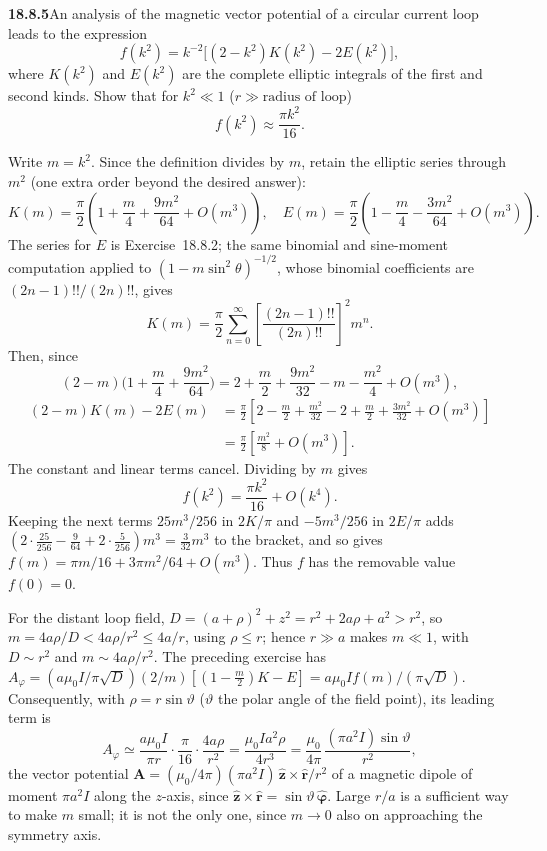 \par\bigskip
\noindent\textbf{18.8.5}\quad An analysis of the magnetic vector
potential of a circular current loop leads to the expression
\[
f(k^{2})=k^{-2}\big[(2-k^{2})K(k^{2})-2E(k^{2})\big],
\]
where $K(k^{2})$ and $E(k^{2})$ are the complete elliptic integrals
of the first and second kinds. Show that for $k^{2}\ll1$
($r\gg\text{radius of loop}$)
\[
f(k^{2})\approx\frac{\pi k^{2}}{16}.
\]
\par\nobreak
\solution
Write $m=k^2$.  Since the definition divides by $m$, retain the
elliptic series through $m^2$ (one extra order beyond the desired
answer):
\[
K(m)=\frac\pi2\left(1+\frac m4+\frac{9m^2}{64}+O(m^3)\right),
\quad
E(m)=\frac\pi2\left(1-\frac m4-\frac{3m^2}{64}+O(m^3)\right).
\]
The series for $E$ is Exercise~18.8.2; the same binomial and
sine-moment computation applied to $(1-m\sin^2\theta)^{-1/2}$, whose
binomial coefficients are $(2n-1)!!/(2n)!!$, gives
\[
K(m)=\frac\pi2\sum_{n=0}^\infty
 \left[\frac{(2n-1)!!}{(2n)!!}\right]^2m^n.
\]
Then, since
\[
(2-m)\Big(1+\frac m4+\frac{9m^2}{64}\Big)
=2+\frac m2+\frac{9m^2}{32}-m-\frac{m^2}4+O(m^3),
\]
\begin{align*}
(2-m)K(m)-2E(m)
 &=\frac\pi2\left[
 2-\frac m2+\frac{m^2}{32}
 -2+\frac m2+\frac{3m^2}{32}+O(m^3)\right]\\
 &=\frac\pi2\left[\frac{m^2}{8}+O(m^3)\right].
\end{align*}
The constant and linear terms cancel.  Dividing by $m$ gives
\[
\boxed{f(k^2)=\frac{\pi k^2}{16}+O(k^4)}.
\]
Keeping the next terms $25m^3/256$ in $2K/\pi$ and
$-5m^3/256$ in $2E/\pi$ adds
$(2\cdot\frac{25}{256}-\frac9{64}+2\cdot\frac5{256})m^3
=\frac3{32}m^3$ to the bracket, and so gives
$f(m)=\pi m/16+3\pi m^2/64+O(m^3)$.
Thus $f$ has the removable value $f(0)=0$.

For the distant loop field, $D=(a+\rho)^2+z^2=r^2+2a\rho+a^2>r^2$,
so $m=4a\rho/D<4a\rho/r^2\le4a/r$, using $\rho\le r$; hence $r\gg a$
makes $m\ll1$, with $D\sim r^2$ and $m\sim4a\rho/r^2$.  The
preceding exercise has
$A_\varphi=(a\mu_0I/\pi\sqrt D)(2/m)[(1-\tfrac m2)K-E]
=a\mu_0I f(m)/(\pi\sqrt D)$.
Consequently, with $\rho=r\sin\vartheta$ ($\vartheta$ the polar
angle of the field point), its leading term is
\[
A_\varphi\simeq\frac{a\mu_0I}{\pi r}\cdot\frac\pi{16}\cdot
 \frac{4a\rho}{r^2}=\frac{\mu_0Ia^2\rho}{4r^3}
 =\frac{\mu_0}{4\pi}\,\frac{(\pi a^2I)\sin\vartheta}{r^2},
\]
the vector potential
$\mathbf A=(\mu_0/4\pi)(\pi a^2I)\,\hat{\mathbf z}\times\hat{\mathbf r}/r^2$
of a magnetic dipole of moment $\pi a^2I$ along the $z$-axis, since
$\hat{\mathbf z}\times\hat{\mathbf r}=\sin\vartheta\,\hat{\boldsymbol\varphi}$.  Large $r/a$ is a sufficient way to
make $m$ small; it is not the only one, since $m\to0$ also
on approaching the symmetry axis.

